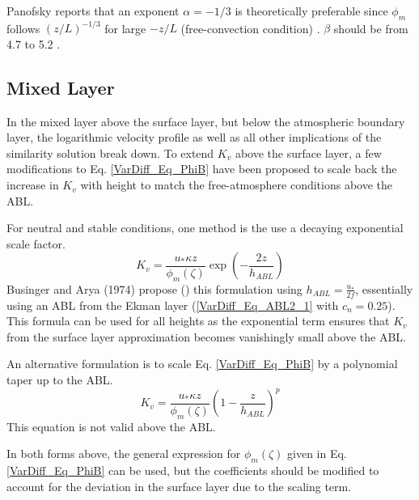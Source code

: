 Panofsky reports that an exponent $\alpha=-1/3$ is theoretically preferable
since $\phi_m$ follows $(z/L)^{-1/3}$ for large $-z/L$ (free-convection condition) \cite[p.134]{Panofsky1984}.
$\beta$ should be from 4.7 to 5.2 \cite[p.136]{Panofsky1984}.

\subsection{Mixed Layer}
In the mixed layer above the surface layer, but below the atmospheric boundary layer,
the logarithmic velocity profile as well as all other implications of the similarity
solution break down. To extend $K_v$ above the surface layer, a few modifications to
Eq. \ref{VarDiff_Eq_PhiB} have been proposed to scale back the increase in $K_v$ with
height to match the free-atmosphere conditions above the ABL.

For neutral and stable conditions, one method is the use a decaying exponential scale
factor.
\begin{equation}\label{VarDiff_Eq_Kz_Mixed_Exp}
K_v = \frac{u_{*} \kappa z}{\phi_m(\zeta)} \exp \left( -\frac{2 z}{h_{ABL}} \right)
\end{equation}
Businger and Arya (1974) propose (\cite[p.872]{Seinfeld2006})
this formulation using $h_{ABL}=\frac{u_*}{2 f}$, essentially
using an ABL from the Ekman layer (\ref{VarDiff_Eq_ABL2_1} with $c_n=0.25$).
This formula can be used for all heights as the exponential
term ensures that $K_v$ from the surface layer approximation becomes vanishingly
small above the ABL.

An alternative formulation is to scale Eq. \ref{VarDiff_Eq_PhiB} by a polynomial taper
up to the ABL.
\begin{equation}\label{VarDiff_Eq_Kz_Mixed_Poly}
K_v = \frac{u_{*} \kappa z}{\phi_m(\zeta)} \left( 1-\frac{z}{h_{ABL}} \right)^p
\end{equation}
This equation is not valid above the ABL.

In both forms above, the general expression for $\phi_m(\zeta)$ given in Eq. \ref{VarDiff_Eq_PhiB}
can be used, but the coefficients should be modified to account for the deviation in the
surface layer due to the scaling term.

